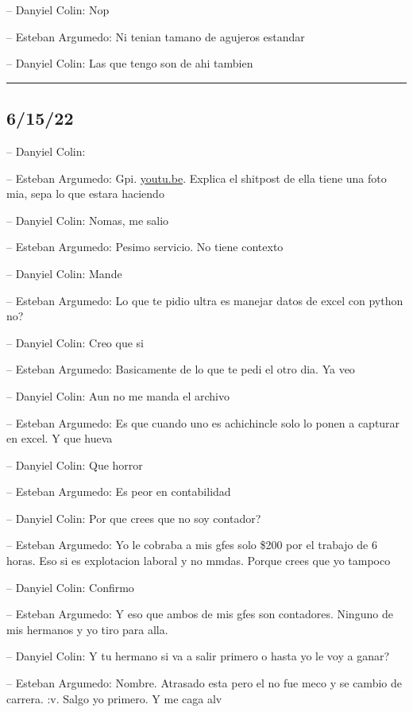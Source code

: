 -- Danyiel Colin: Nop

-- Esteban Argumedo: Ni tenian tamano de agujeros estandar

-- Danyiel Colin: Las que tengo son de ahi tambien

\begin{center}\rule{0.5\linewidth}{0.5pt}\end{center}

\hypertarget{section-102}{%
\subsection{6/15/22}\label{section-102}}

-- Danyiel Colin:

-- Esteban Argumedo: Gpi. \href{https://youtu.be/Ok46fbMnOVg}{youtu.be}.
Explica el shitpost de ella tiene una foto mia, sepa lo que estara
haciendo

-- Danyiel Colin: Nomas, me salio

-- Esteban Argumedo: Pesimo servicio. No tiene contexto

-- Danyiel Colin: Mande

-- Esteban Argumedo: Lo que te pidio ultra es manejar datos de excel con
python no?

-- Danyiel Colin: Creo que si

-- Esteban Argumedo: Basicamente de lo que te pedi el otro dia. Ya veo

-- Danyiel Colin: Aun no me manda el archivo

-- Esteban Argumedo: Es que cuando uno es achichincle solo lo ponen a
capturar en excel. Y que hueva

-- Danyiel Colin: Que horror

-- Esteban Argumedo: Es peor en contabilidad

-- Danyiel Colin: Por que crees que no soy contador?

-- Esteban Argumedo: Yo le cobraba a mis gfes solo \$200 por el trabajo
de 6 horas. Eso si es explotacion laboral y no mmdas. Porque crees que
yo tampoco

-- Danyiel Colin: Confirmo

-- Esteban Argumedo: Y eso que ambos de mis gfes son contadores. Ninguno
de mis hermanos y yo tiro para alla.

-- Danyiel Colin: Y tu hermano si va a salir primero o hasta yo le voy a
ganar?

-- Esteban Argumedo: Nombre. Atrasado esta pero el no fue meco y se
cambio de carrera. :v. Salgo yo primero. Y me caga alv

